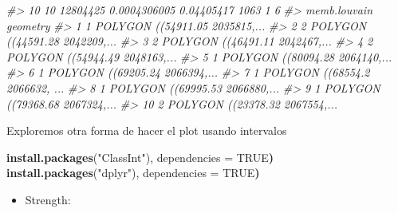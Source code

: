 \documentclass[
]{book}
\newenvironment{Shaded}{\begin{snugshade}}{\end{snugshade}}
\newcommand{\CommentTok}[1]{\textcolor[rgb]{0.56,0.35,0.01}{\textit{#1}}}
\newcommand{\ConstantTok}[1]{\textcolor[rgb]{0.56,0.35,0.01}{#1}}
\newcommand{\ErrorTok}[1]{\textcolor[rgb]{0.64,0.00,0.00}{\textbf{#1}}}
\newcommand{\FunctionTok}[1]{\textcolor[rgb]{0.13,0.29,0.53}{\textbf{#1}}}
\newcommand{\NormalTok}[1]{#1}
\newcommand{\OtherTok}[1]{\textcolor[rgb]{0.56,0.35,0.01}{#1}}
\newcommand{\StringTok}[1]{\textcolor[rgb]{0.31,0.60,0.02}{#1}}
\providecommand{\tightlist}{%
  \setlength{\itemsep}{0pt}\setlength{\parskip}{0pt}}
\begin{document}
\begin{Shaded}
\begin{Highlighting}[]
\CommentTok{\#\textgreater{} 10 10 12804425 0.0004306005 0.04405417 1063       1       6}
\CommentTok{\#\textgreater{}    memb.louvain                       geometry}
\CommentTok{\#\textgreater{} 1             1 POLYGON ((54911.05 2035815,...}
\CommentTok{\#\textgreater{} 2             2 POLYGON ((44591.28 2042209,...}
\CommentTok{\#\textgreater{} 3             2 POLYGON ((46491.11 2042467,...}
\CommentTok{\#\textgreater{} 4             2 POLYGON ((54944.49 2048163,...}
\CommentTok{\#\textgreater{} 5             1 POLYGON ((80094.28 2064140,...}
\CommentTok{\#\textgreater{} 6             1 POLYGON ((69205.24 2066394,...}
\CommentTok{\#\textgreater{} 7             1 POLYGON ((68554.2 2066632, ...}
\CommentTok{\#\textgreater{} 8             1 POLYGON ((69995.53 2066880,...}
\CommentTok{\#\textgreater{} 9             1 POLYGON ((79368.68 2067324,...}
\CommentTok{\#\textgreater{} 10            2 POLYGON ((23378.32 2067554,...}
\end{Highlighting}
\end{Shaded}

Exploremos otra forma de hacer el plot usando intervalos

\begin{Shaded}
\begin{Highlighting}[]
\FunctionTok{install.packages}\NormalTok{(}\StringTok{"ClassInt"}\NormalTok{), dependencies }\OtherTok{=} \ConstantTok{TRUE}\ErrorTok{)}
\FunctionTok{install.packages}\NormalTok{(}\StringTok{"dplyr"}\NormalTok{), dependencies }\OtherTok{=} \ConstantTok{TRUE}\ErrorTok{)}
\end{Highlighting}
\end{Shaded}

\begin{itemize}
\tightlist
\item
  Strength:
\end{itemize}
\end{document}
